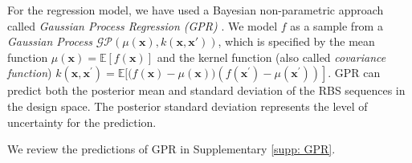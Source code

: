 For the regression model, we have used a Bayesian non-parametric approach called \textit{Gaussian Process Regression (GPR)} \cite{Rasmussen2004,srinivas2012information, romero_navigating_2013}.
We model $f$ as a sample from a \textit{Gaussian Process} $\mathcal{G} \mathcal{P}(\mu(\mathbf{x}), k(\mathbf{x}, \mathbf{x'}))$, which is specified by the mean function $\mu(\mathbf{x})=\mathbb{E}[f(\mathbf{x})]$ and the kernel function (also called \textit{covariance function}) $k\left(\mathbf{x}, \mathbf{x}^{\prime}\right)=\mathbb{E}[(f(\mathbf{x})-\left.\mu(\mathbf{x}))\left(f\left(\mathbf{x}^{\prime}\right)-\mu\left(\mathbf{x}^{\prime}\right)\right)\right]$.
GPR can predict both the posterior mean and standard deviation of the RBS sequences in the design space. The posterior standard deviation represents the level of uncertainty for the prediction. 

We review the predictions of GPR in Supplementary \ref{supp: GPR}.\\


